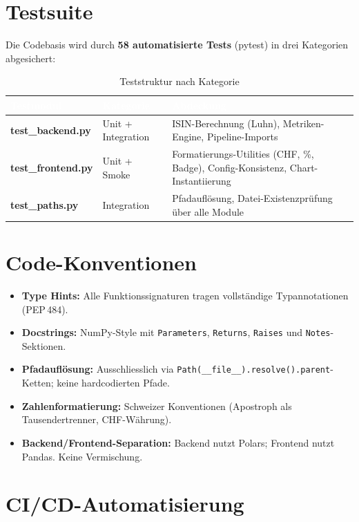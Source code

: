 \documentclass[12pt, a4paper, oneside]{report}
\newcommand{\code}[1]{\texttt{\small\textcolor{darknavy}{#1}}}
\begin{document}
\section{Testsuite}

Die Codebasis wird durch \textbf{58 automatisierte Tests} (pytest) in drei Kategorien abgesichert:

\begin{table}[H]
\centering
\caption{Teststruktur nach Kategorie}
\begin{tabularx}{\textwidth}{>{\bfseries\sffamily}p{3.5cm} p{3cm} X}
  \toprule
  \rowcolor{darknavy} \textcolor{white}{Testmodul} & \textcolor{white}{Kategorie} & \textcolor{white}{Abdeckung} \\
  \midrule
  test\_backend.py  & Unit + Integration & ISIN-Berechnung (Luhn), Metriken-Engine, Pipeline-Imports \\
  test\_frontend.py & Unit + Smoke       & Formatierungs-Utilities (CHF, \%, Badge), Config-Konsistenz, Chart-Instantiierung \\
  test\_paths.py    & Integration        & Pfadauflösung, Datei-Existenzprüfung über alle Module \\
  \bottomrule
\end{tabularx}
\end{table}

\section{Code-Konventionen}

\begin{itemize}
  \item \textbf{Type Hints:} Alle Funktionssignaturen tragen vollständige Typannotationen (PEP\,484).
  \item \textbf{Docstrings:} NumPy-Style mit \code{Parameters}, \code{Returns}, \code{Raises} und \code{Notes}-Sektionen.
  \item \textbf{Pfadauflösung:} Ausschliesslich via \code{Path(\_\_file\_\_).resolve().parent}-Ketten; keine hardcodierten Pfade.
  \item \textbf{Zahlenformatierung:} Schweizer Konventionen (Apostroph als Tausendertrenner, CHF-Währung).
  \item \textbf{Backend/Frontend-Separation:} Backend nutzt Polars; Frontend nutzt Pandas. Keine Vermischung.
\end{itemize}

\section{CI/CD-Automatisierung}
\end{document}
